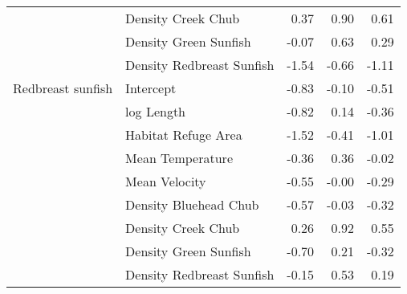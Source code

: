 \begin{table}[ht]
\begin{tabular}{llrrr}
   & Density Creek Chub & 0.37 & 0.90 & 0.61 \\ 
   & Density Green Sunfish & -0.07 & 0.63 & 0.29 \\ 
   & Density Redbreast Sunfish & -1.54 & -0.66 & -1.11 \\ 
  Redbreast sunfish & Intercept & -0.83 & -0.10 & -0.51 \\ 
   & log Length & -0.82 & 0.14 & -0.36 \\ 
   & Habitat Refuge Area & -1.52 & -0.41 & -1.01 \\ 
   & Mean Temperature & -0.36 & 0.36 & -0.02 \\ 
   & Mean Velocity & -0.55 & -0.00 & -0.29 \\ 
   & Density Bluehead Chub & -0.57 & -0.03 & -0.32 \\ 
   & Density Creek Chub & 0.26 & 0.92 & 0.55 \\ 
   & Density Green Sunfish & -0.70 & 0.21 & -0.32 \\ 
   & Density Redbreast Sunfish & -0.15 & 0.53 & 0.19 \\ 
   \hline
\end{tabular}
\end{table}
